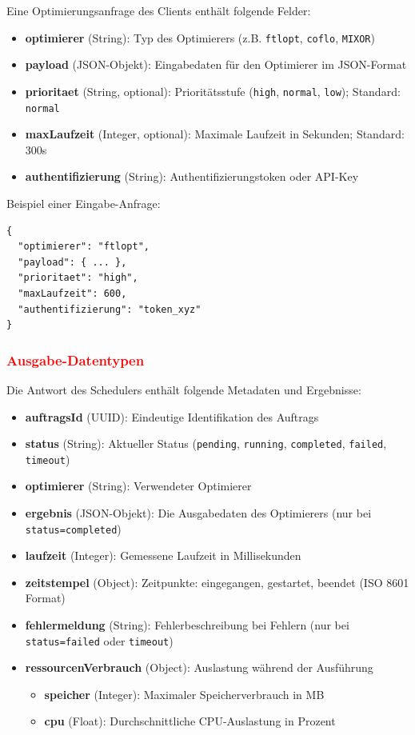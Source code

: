 Eine Optimierungsanfrage des Clients enthält folgende Felder:

\begin{itemize}
    \item \textbf{optimierer} (String): Typ des Optimierers (z.B. \texttt{ftlopt}, \texttt{coflo}, \texttt{MIXOR})
    \item \textbf{payload} (JSON-Objekt): Eingabedaten für den Optimierer im JSON-Format
    \item \textbf{prioritaet} (String, optional): Prioritätsstufe (\texttt{high}, \texttt{normal}, \texttt{low}); Standard: \texttt{normal}
    \item \textbf{maxLaufzeit} (Integer, optional): Maximale Laufzeit in Sekunden; Standard: 300s
    \item \textbf{authentifizierung} (String): Authentifizierungstoken oder API-Key
\end{itemize}

Beispiel einer Eingabe-Anfrage:
\begin{verbatim}
{
  "optimierer": "ftlopt",
  "payload": { ... },
  "prioritaet": "high",
  "maxLaufzeit": 600,
  "authentifizierung": "token_xyz"
}
\end{verbatim}

\subsubsection{\textcolor{red}{Ausgabe-Datentypen}}

Die Antwort des Schedulers enthält folgende Metadaten und Ergebnisse:

\begin{itemize}
    \item \textbf{auftragsId} (UUID): Eindeutige Identifikation des Auftrags
    \item \textbf{status} (String): Aktueller Status (\texttt{pending}, \texttt{running}, \texttt{completed}, \texttt{failed}, \texttt{timeout})
    \item \textbf{optimierer} (String): Verwendeter Optimierer
    \item \textbf{ergebnis} (JSON-Objekt): Die Ausgabedaten des Optimierers (nur bei \texttt{status=completed})
    \item \textbf{laufzeit} (Integer): Gemessene Laufzeit in Millisekunden
    \item \textbf{zeitstempel} (Object): Zeitpunkte: eingegangen, gestartet, beendet (ISO 8601 Format)
    \item \textbf{fehlermeldung} (String): Fehlerbeschreibung bei Fehlern (nur bei \texttt{status=failed} oder \texttt{timeout})
    \item \textbf{ressourcenVerbrauch} (Object): Auslastung während der Ausführung
    \begin{itemize}
        \item \textbf{speicher} (Integer): Maximaler Speicherverbrauch in MB
        \item \textbf{cpu} (Float): Durchschnittliche CPU-Auslastung in Prozent
    \end{itemize}
\end{itemize}

